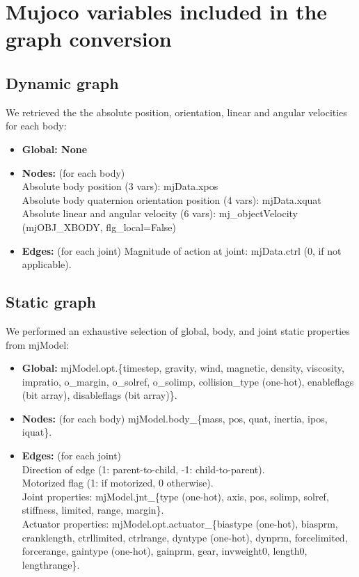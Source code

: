 \section{Mujoco variables included in the graph conversion}
\label{sm:sec:mujoco_variables}

\subsection{Dynamic graph}

We retrieved the the absolute position, orientation, linear and angular velocities for each body:
\begin{itemize}
\item \textbf{Global: None}
\item \textbf{Nodes:} (for each body)\\
Absolute body position (3 vars): mjData.xpos \\
Absolute body quaternion orientation position (4 vars): mjData.xquat \\
Absolute linear and angular velocity (6 vars): mj\_objectVelocity
(mjOBJ\_XBODY, flg\_local=False)
\item \textbf{Edges:} (for each joint) Magnitude of action at joint: mjData.ctrl (0, if not applicable).
\end{itemize}

\subsection{Static graph}
We performed an exhaustive selection of global, body, and joint static properties from mjModel:
\begin{itemize}
\item \textbf{Global:} mjModel.opt.\{timestep, gravity, wind, magnetic, density, viscosity, impratio, o\_margin, o\_solref, o\_solimp, collision\_type (one-hot), enableflags (bit array), disableflags (bit array)\}.
\item \textbf{Nodes:} (for each body) mjModel.body\_\{mass, pos, quat, inertia, ipos, iquat\}.
\item \textbf{Edges:} (for each joint) \\Direction of edge (1: parent-to-child, -1: child-to-parent). \\Motorized flag (1: if motorized, 0 otherwise). \\Joint properties: mjModel.jnt\_\{type (one-hot), axis, pos, solimp, solref, stiffness, limited, range, margin\}. \\Actuator properties: mjModel.opt.actuator\_\{biastype (one-hot), biasprm, cranklength, ctrllimited, ctrlrange, dyntype (one-hot), dynprm, forcelimited, forcerange, gaintype (one-hot), gainprm, gear, invweight0, length0, lengthrange\}.
\end{itemize}

